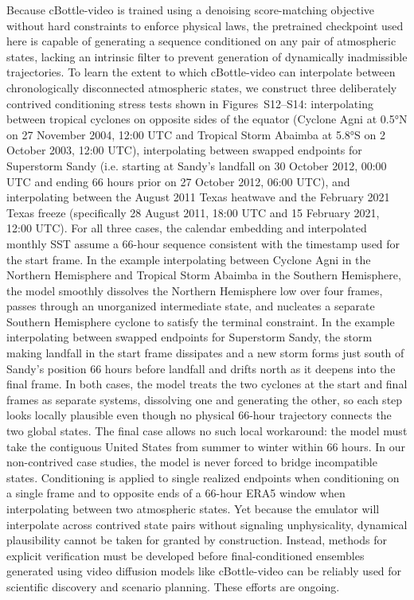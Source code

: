 \documentclass[final]{agujournal2019}
\begin{document}
Because cBottle-video is trained using a denoising score-matching objective without hard constraints to enforce physical laws, the pretrained checkpoint used here is capable of generating a sequence conditioned on any pair of atmospheric states, lacking an intrinsic filter to prevent generation of dynamically inadmissible trajectories. To learn the extent to which cBottle-video can interpolate between chronologically disconnected atmospheric states, we construct three deliberately contrived conditioning stress tests shown in Figures~S12--S14: interpolating between tropical cyclones on opposite sides of the equator (Cyclone Agni at \ang{0.5}N on 27 November 2004, 12:00 UTC and Tropical Storm Abaimba at \ang{5.8}S on 2 October 2003, 12:00 UTC), interpolating between swapped endpoints for Superstorm Sandy (i.e. starting at Sandy's landfall on 30 October 2012, 00:00 UTC and ending 66 hours prior on 27 October 2012, 06:00 UTC), and interpolating between the August 2011 Texas heatwave and the February 2021 Texas freeze (specifically 28 August 2011, 18:00 UTC and 15 February 2021, 12:00 UTC). For all three cases, the calendar embedding and interpolated monthly SST assume a 66-hour sequence consistent with the timestamp used for the start frame. In the example interpolating between Cyclone Agni in the Northern Hemisphere and Tropical Storm Abaimba in the Southern Hemisphere, the model smoothly dissolves the Northern Hemisphere low over four frames, passes through an unorganized intermediate state, and nucleates a separate Southern Hemisphere cyclone to satisfy the terminal constraint. In the example interpolating between swapped endpoints for Superstorm Sandy, the storm making landfall in the start frame dissipates and a new storm forms just south of Sandy's position 66 hours before landfall and drifts north as it deepens into the final frame. In both cases, the model treats the two cyclones at the start and final frames as separate systems, dissolving one and generating the other, so each step looks locally plausible even though no physical 66-hour trajectory connects the two global states. The final case allows no such local workaround: the model must take the contiguous United States from summer to winter within 66 hours. In our non-contrived case studies, the model is never forced to bridge incompatible states. Conditioning is applied to single realized endpoints when conditioning on a single frame and to opposite ends of a 66-hour ERA5 window when interpolating between two atmospheric states. Yet because the emulator will interpolate across contrived state pairs without signaling unphysicality, dynamical plausibility cannot be taken for granted by construction. Instead, methods for explicit verification must be developed before final-conditioned ensembles generated using video diffusion models like cBottle-video can be reliably used for scientific discovery and scenario planning. These efforts are ongoing.
\end{document}
